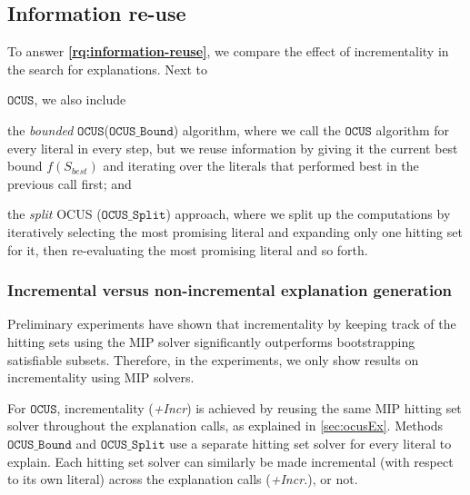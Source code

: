 \documentclass[twoside,11pt]{article}
\newcommand\m[1]{\mathcal{#1}}
\newcommand\comment[1]{\marginpar{\tiny #1}}
\renewcommand\comment[1]{#1}
\newcommand{\tias}[1]{{\comment{\color{blue}Tias:#1}}}
\newcommand{\emilio}[1]{{\comment{\color{red}Emilio: #1}}}
\newcommand{\bart}[1]{{\comment{\color{OliveGreen}Bart: #1}}}
\newcommand\mm[1]{\ensuremath{#1}\xspace}
\newcommand\call[1]{\mm{\texttt{#1}}}
\newcommand\comus{\mm{\call{OCUS}}}
\newcommand\comusincr{\mm{\call{OCUS+Incr.}}}
\newcommand\ousb{\mm{\call{OCUS\_Bound}}}
\newcommand\ousbiter{\mm{\call{OCUS\_Split}}}
\begin{document}
\subsection{Information re-use}\label{sec:experiments:incrementality}

To answer \textbf{\ref{rq:information-reuse}}, we compare the effect of incrementality in the search for explanations. 
Next to \begin{inparaenum}[(1)]
	\item \textbf{\comus}, we also include
	\item the \emph{bounded} \comus (\ousb) algorithm, where we call the \comus algorithm for every literal in every step, but we reuse information by giving it the current best bound $f(S_{best})$ and iterating over the literals that performed best in the previous call first; and
	\item the \emph{split} OCUS (\ousbiter) approach, where we split up the computations by iteratively selecting the most promising literal and expanding only one hitting set for it, then re-evaluating the most promising literal and so forth.
\end{inparaenum}


\subsubsection{Incremental versus non-incremental explanation generation}
Preliminary experiments have shown that incrementality by keeping track of the hitting sets using the MIP solver significantly outperforms bootstrapping satisfiable subsets. Therefore, in the experiments, we only show results on incrementality using MIP solvers.%


For \comus, incrementality (\emph{+Incr}) is achieved by reusing the same MIP hitting set solver throughout the explanation calls, as explained in \cref{sec:ocusEx}. 
Methods \ousb and \ousbiter use a separate hitting set solver for every literal to explain. Each hitting set solver can similarly be made incremental (with respect to its own literal) across the explanation calls (\emph{+Incr.}), or not.%
\end{document}
